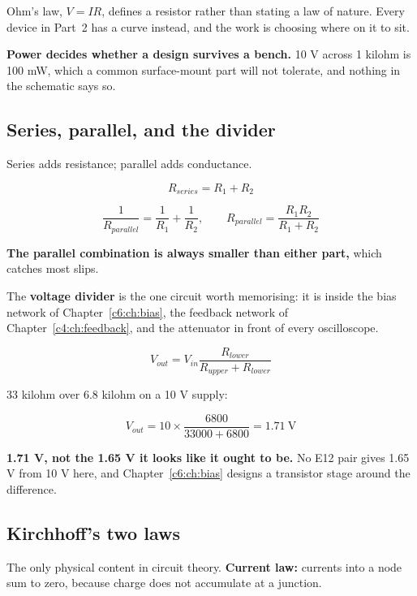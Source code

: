 Ohm's law, $V = IR$, defines a resistor rather than stating a law of nature. Every device in Part~2 has a curve instead, and the work is choosing where on it to sit.

\textbf{Power decides whether a design survives a bench.} 10 V across 1 kilohm is 100 mW, which a common surface-mount part will not tolerate, and nothing in the schematic says so.

\subsection{Series, parallel, and the divider}
\label{c1:sec:a3}
Series adds resistance; parallel adds conductance.

\[
  R_{series} = R_1 + R_2
\]

\[
  \frac{1}{R_{parallel}} = \frac{1}{R_1} + \frac{1}{R_2}, \qquad R_{parallel} = \frac{R_1 R_2}{R_1 + R_2}
\]

\textbf{The parallel combination is always smaller than either part,} which catches most slips.

The \textbf{voltage divider} is the one circuit worth memorising: it is inside the bias network of Chapter~\ref{c6:ch:bias}, the feedback network of Chapter~\ref{c4:ch:feedback}, and the attenuator in front of every oscilloscope.

\[
  V_{out} = V_{in} \frac{R_{lower}}{R_{upper} + R_{lower}}
\]


33 kilohm over 6.8 kilohm on a 10 V supply:

\[
  V_{out} = 10 \times \frac{6800}{33000 + 6800} = 1.71\ \text{V}
\]

\textbf{1.71 V, not the 1.65 V it looks like it ought to be.} No E12 pair gives 1.65 V from 10 V here, and Chapter~\ref{c6:ch:bias} designs a transistor stage around the difference.

\subsection{Kirchhoff's two laws}
\label{c1:sec:a4}
The only physical content in circuit theory. \textbf{Current law:} currents into a node sum to zero, because charge does not accumulate at a junction.

